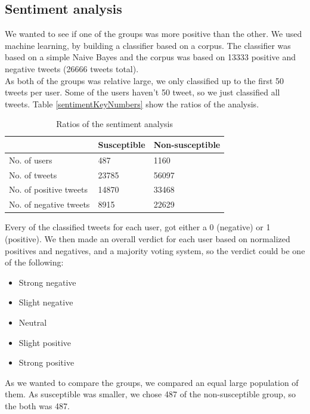 \documentclass[10pt]{IEEEtran}
\begin{document}
\subsection{Sentiment analysis}
We wanted to see if one of the groups was more positive than the other. We used machine learning, by building a classifier based on a corpus. The classifier was based on a simple Naive Bayes and the corpus was based on 13333 positive and negative tweets (26666 tweets total). \\
As both of the groups was relative large, we only classified up to the first 50 tweets per user. Some of the users haven't 50 tweet, so we just classified all tweets. 
Table \ref{sentimentKeyNumbers} show the ratios of the analysis. 

\begin{table}[H]
\centering
\begin{tabular}{lll}
\hline
                       & Susceptible & Non-susceptible \\ \hline
No. of users           & 487         & 1160   \\
No. of tweets          & 23785       & 56097   \\
No. of positive tweets & 14870       & 33468   \\
No. of negative tweets & 8915        & 22629   \\ \hline
\end{tabular}
\caption{Ratios of the sentiment analysis}
\label{tab:sentimentKeyNumbers}
\end{table}

Every of the classified tweets for each user, got either a 0 (negative) or 1 (positive). We then made an overall verdict for each user based on normalized positives and negatives, and a majority voting system, so the verdict could be one of the following:

\begin{itemize}
  \item Strong negative
  \item Slight negative
  \item Neutral
  \item Slight positive
  \item Strong positive\\
\end{itemize}

As we wanted to compare the groups, we compared an equal large population of them. As susceptible was smaller, we chose 487 of the non-susceptible group, so the both was 487.  \\
\end{document}

